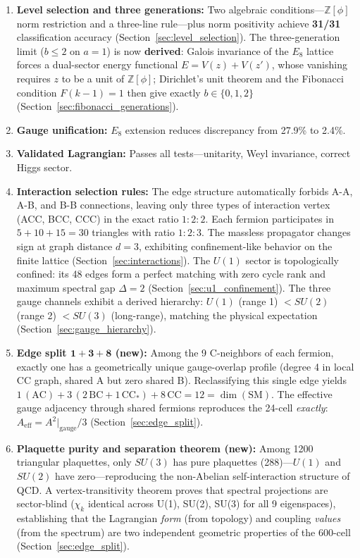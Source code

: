 \documentclass[12pt,a4paper]{article}
\begin{document}
\begin{enumerate}
    \item \textbf{Level selection and three generations:} Two algebraic conditions---$\mathbb{Z}[\phi]$ norm restriction and a three-line rule---plus norm positivity achieve \textbf{31/31} classification accuracy (Section~\ref{sec:level_selection}). The three-generation limit ($b \leq 2$ on $a=1$) is now \textbf{derived}: Galois invariance of the $E_8$ lattice forces a dual-sector energy functional $E = V(z) + V(z')$, whose vanishing requires $z$ to be a unit of $\mathbb{Z}[\phi]$; Dirichlet's unit theorem and the Fibonacci condition $F(k\!-\!1)=1$ then give exactly $b \in \{0,1,2\}$ (Section~\ref{sec:fibonacci_generations}).

    \item \textbf{Gauge unification:} $E_8$ extension reduces discrepancy from 27.9\% to 2.4\%.

    \item \textbf{Validated Lagrangian:} Passes all tests---unitarity, Weyl invariance, correct Higgs sector.

    \item \textbf{Interaction selection rules:} The edge structure automatically forbids A-A, A-B, and B-B connections, leaving only three types of interaction vertex (ACC, BCC, CCC) in the exact ratio $1:2:2$. Each fermion participates in $5 + 10 + 15 = 30$ triangles with ratio $1:2:3$. The massless propagator changes sign at graph distance $d = 3$, exhibiting confinement-like behavior on the finite lattice (Section~\ref{sec:interactions}). The $U(1)$ sector is topologically confined: its 48 edges form a perfect matching with zero cycle rank and maximum spectral gap $\Delta = 2$ (Section~\ref{sec:u1_confinement}). The three gauge channels exhibit a derived hierarchy: $U(1)$ (range 1) $< SU(2)$ (range 2) $< SU(3)$ (long-range), matching the physical expectation (Section~\ref{sec:gauge_hierarchy}).

    \item \textbf{Edge split $\mathbf{1+3+8}$ (new):} Among the 9 C-neighbors of each fermion, exactly one has a geometrically unique gauge-overlap profile (degree 4 in local CC graph, shared A but zero shared B). Reclassifying this single edge yields $1\,(\text{AC}) + 3\,(2\,\text{BC} + 1\,\text{CC}_*) + 8\,\text{CC} = 12 = \dim(\text{SM})$. The effective gauge adjacency through shared fermions reproduces the 24-cell \emph{exactly}: $A_{\text{eff}} = A^2|_{\text{gauge}}/3$ (Section~\ref{sec:edge_split}).

    \item \textbf{Plaquette purity and separation theorem (new):} Among 1200 triangular plaquettes, only $SU(3)$ has pure plaquettes (288)---$U(1)$ and $SU(2)$ have zero---reproducing the non-Abelian self-interaction structure of QCD. A vertex-transitivity theorem proves that spectral projections are sector-blind ($\chi_k$ identical across U(1), SU(2), SU(3) for all 9 eigenspaces), establishing that the Lagrangian \emph{form} (from topology) and coupling \emph{values} (from the spectrum) are two independent geometric properties of the 600-cell (Section~\ref{sec:edge_split}).


\end{enumerate}
\end{document}
